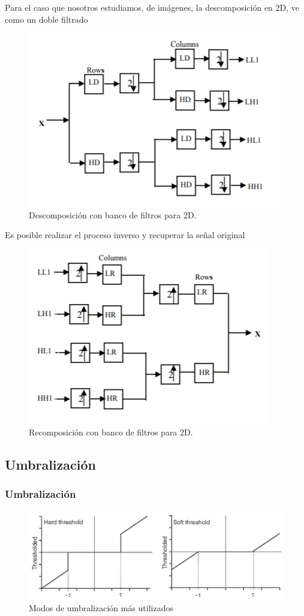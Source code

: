 \documentclass{beamer}
\begin{document}
\begin{frame}
Para el caso que nosotros estudiamos, de imágenes, la descomposición en 2D, ve como un doble filtrado
\begin{figure}[H]
	\centering
	\includegraphics[width=.75\textwidth]{imgs/bancofiltros}
	\caption{Descomposición con banco de filtros para 2D.}
	\label{bancofiltros}
\end{figure}
\end{frame}
\begin{frame}
Es posible realizar el proceso inverso y recuperar la señal original
\begin{figure}[H]
	\centering
	\includegraphics[width=.75\textwidth]{imgs/bancofiltrosR}
	\caption{Recomposición con banco de filtros para 2D.}
	\label{bancofiltrosR}
\end{figure}
\end{frame}

\begin{frame}
\subsection{Umbralización}
\frametitle{Umbralización}
\centering
\begin{figure}[htb]
  \centering
  \includegraphics[scale=0.4]{imgs/Umbral}
  \caption{Modos de umbralización más utilizados}
  \label{}
\end{figure}
\end{frame}
\end{document}
